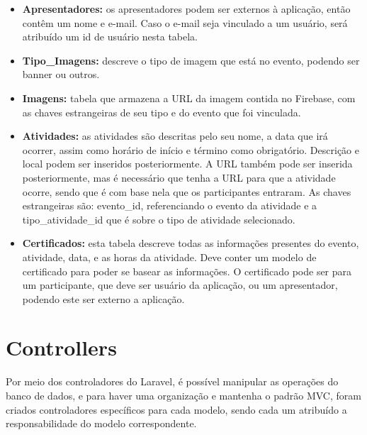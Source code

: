 \begin{itemize}
    \item \textbf{Apresentadores:} os apresentadores podem ser externos à aplicação, então contêm um nome e e-mail. Caso o e-mail seja vinculado a um usuário, será atribuído um id de usuário nesta tabela.
    
    \item \textbf{Tipo\_Imagens:} descreve o tipo de imagem que está no evento, podendo ser banner ou outros.
    
    \item \textbf{Imagens:} tabela que armazena a URL da imagem contida no Firebase, com as chaves estrangeiras de seu tipo e do evento que foi vinculada.
    
    \item \textbf{Atividades:} as atividades são descritas pelo seu nome, a data que irá ocorrer, assim como horário de início e término como obrigatório. Descrição e local podem ser inseridos posteriormente. A URL também pode ser inserida posteriormente, mas é necessário que tenha a URL para que a atividade ocorre, sendo que é com base nela que os participantes entraram. As chaves estrangeiras são: evento\_id, referenciando o evento da atividade e a tipo\_atividade\_id que é sobre o tipo de atividade selecionado.
    
    \item \textbf{Certificados:} esta tabela descreve todas as informações presentes do evento, atividade, data, e as horas da atividade. Deve conter um modelo de certificado para poder se basear as informações. O certificado pode ser para um participante, que deve ser usuário da aplicação, ou um apresentador, podendo este ser externo a aplicação.
    
\end{itemize}

\section{Controllers}
Por meio dos controladores do Laravel, é possível manipular as operações do banco de dados, e para haver uma organização e mantenha o padrão MVC, foram criados controladores específicos para cada modelo, sendo cada um atribuído a responsabilidade do modelo correspondente.

